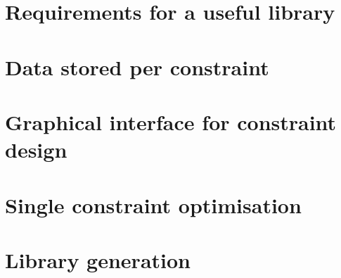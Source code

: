 \section{Requirements for a useful library}


\section{Data stored per constraint}


\section{Graphical interface for constraint design}


\section{Single constraint optimisation}


\section{Library generation}
